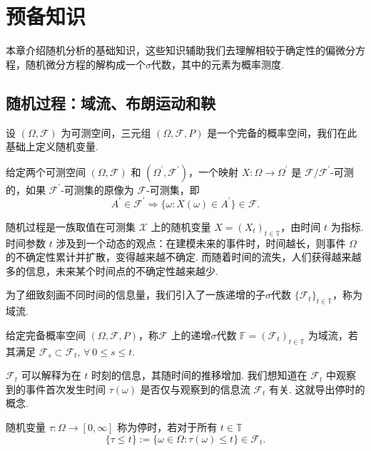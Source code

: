 \chapter{预备知识}\label{chap2}
本章介绍随机分析的基础知识，这些知识辅助我们去理解相较于确定性的偏微分方程，随机微分方程的解构成一个$\sigma$代数，其中的元素为概率测度. 

\section{随机过程：域流、布朗运动和鞅}
设 $(\Omega,\mathcal F)$ 为可测空间，三元组 $(\Omega,\mathcal F,P)$ 是一个完备的概率空间，我们在此基础上定义随机变量.
\begin{definition}
	给定两个可测空间 $(\Omega,\mathcal F)$ 和 $(\Omega^\prime,\mathcal F^\prime)$，一个映射 $X:\Omega \to \Omega^\prime$ 是 $\mathcal F/\mathcal F^\prime $-可测的，如果 $\mathcal F^\prime$-可测集的原像为 $\mathcal F$-可测集，即
	\[
	A^\prime \in {\mathcal F}^{\prime} {\Rightarrow} \{ \omega : X(\omega) \in A^ \prime \} \in \mathcal F.
	\]
\end{definition}

随机过程是一族取值在可测集 $\mathcal X$ 上的随机变量 $X = (X_t)_{t\in \mathbb T}$，由时间 $t$ 为指标. 时间参数 $t$ 涉及到一个动态的观点：在建模未来的事件时，时间越长，则事件 $\Omega$ 的不确定性累计并扩散，变得越来越不确定. 而随着时间的流失，人们获得越来越多的信息，未来某个时间点的不确定性越来越少. 

为了细致刻画不同时间的信息量，我们引入了一族递增的子$\sigma$代数 $\{\mathcal F_t\}_{t\in \mathbb T}$，称为域流. 
\begin{definition}[域流，Filtration]  
	给定完备概率空间 $(\Omega,\mathcal F,P)$，称$\mathcal F$ 上的递增$\sigma$代数 $\mathbb F = (\mathcal F_t)_{t \in \mathbb T}$ 为域流，若其满足 $\mathcal F_s \subset \mathcal F_t$, $\forall~0\le s \le t$. 
\end{definition}

$\mathcal F_t$ 可以解释为在 $t$ 时刻的信息，其随时间的推移增加. 我们想知道在 $\mathcal F_t$ 中观察到的事件首次发生时间 $\tau(\omega)$ 是否仅与观察到的信息流 $\mathcal F_t$ 有关. 这就导出停时的概念. 
\begin{definition}
	随机变量 $\tau: \Omega \to [0,\infty]$ 称为停时，若对于所有 $t\in \mathbb T$
	\[
	\{\tau \le t\} := \{ \omega \in \Omega : \tau(\omega) \le t \} \in \mathcal F_t.
	\]
\end{definition}	


